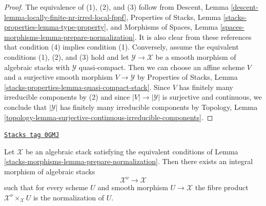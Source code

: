\begin{proof}
The equivalence of (1), (2), and (3) follow from
Descent, Lemma \ref{descent-lemma-locally-finite-nr-irred-local-fppf},
Properties of Stacks, Lemma \ref{stacks-properties-lemma-type-property}, and
Morphisms of Spaces, Lemma \ref{spaces-morphisms-lemma-prepare-normalization}.
It is also clear from these references that condition (4)
implies condition (1). Conversely, assume the equivalent conditions
(1), (2), and (3) hold and let $\mathcal{Y} \to \mathcal{X}$ be a
smooth morphism of algebraic stacks with $\mathcal{Y}$
quasi-compact. Then we can choose an affine scheme $V$ and a surjective
smooth morphism $V \to \mathcal{Y}$ by Properties of Stacks, Lemma
\ref{stacks-properties-lemma-quasi-compact-stack}.
Since $V$ has finitely many irreducible components by (2) and since
$|V| \to |\mathcal{Y}|$ is surjective and continuous, we conclude that
$|\mathcal{Y}|$ has finitely many irreducible components by Topology, Lemma
\ref{topology-lemma-surjective-continuous-irreducible-components}.
\end{proof}

\begin{lemma}[Normalization]
\label{stacks-morphisms-lemma-normalization}
\href{https://stacks.math.columbia.edu/tag/0GMJ}{\texttt{Stacks tag 0GMJ}}

Let $\mathcal{X}$ be an algebraic stack satisfying
the equivalent conditions of Lemma \ref{stacks-morphisms-lemma-prepare-normalization}.
Then there exists an integral morphism of algebraic stacks
$$
\mathcal{X}^\nu \longrightarrow \mathcal{X}
$$
such that for every scheme $U$ and smooth morphism $U \to \mathcal{X}$
the fibre product $\mathcal{X}^\nu \times_\mathcal{X} U$
is the normalization of $U$.
\end{lemma}


